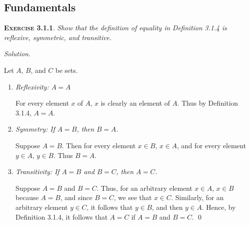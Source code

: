 \documentclass[12pt]{article}
\theoremstyle{remark}
\newenvironment{exer}[2]{
    \noindent \setlength{\parskip}{1em}%
    \textsc{\textbf{Exercise #1}}. \textit{#2} \par
    \noindent \textit{Solution.} %
}{\bigskip}
\begin{document}
\subsection{Fundamentals}
\begin{exer}{3.1.1}{
    Show that the definition of equality in Definition 3.1.4 is reflexive, symmetric, and transitive.
}
    Let $A$, $B$, and $C$ be sets.
    \begin{enumerate}[topsep=0mm, label=(\alph*)]
        \item \textit{Reflexivity: $A = A$}

            For every element $x$ of $A$, $x$ is clearly an element of $A$.
            Thus by Definition 3.1.4, $A = A$.

        \item \textit{Symmetry: If $A = B$, then $B = A$.}

            Suppose $A = B$.
            Then for every element $x \in B$, $x \in A$, and for every element $y \in A$, $y \in B$.
            Thus $B = A$.

        \item \textit{Transitivity: If $A = B$ and $B = C$, then $A = C$.}
        
            Suppose $A = B$ and $B = C$.
            Thus, for an arbitrary element $x \in A$, $x \in B$ because $A = B$,
            and since $B = C$, we see that $x \in C$.
            Similarly, for an arbitrary element $y \in C$, it follows that $y \in B$, and then $y \in A$.
            Hence, by Definition 3.1.4, it follows that $A = C$ if $A = B$ and $B = C$. \qed
    \end{enumerate}
\end{exer}
\end{document}
